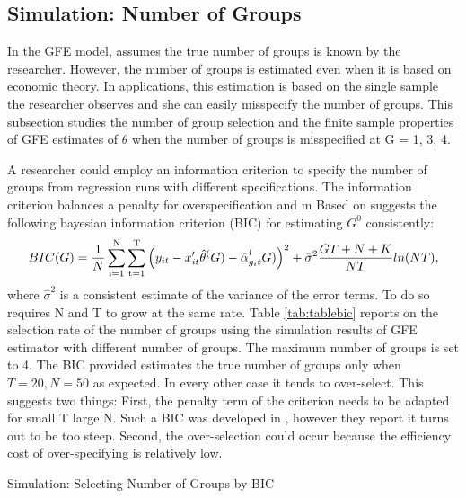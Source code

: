 \subsection{Simulation: Number of Groups}
In the GFE model, \textcite{bonhomme2015grouped} assumes the true number of groups is known by the researcher. However, the number of groups is %
estimated even when it is based on economic theory. In applications, this estimation is based on the single sample the researcher observes and she can easily  misspecify the number of groups. This subsection studies the number of group selection and the finite sample properties of GFE estimates of $\theta$ when the number of groups is misspecified at G = 1, 3, 4.

A researcher could employ an information criterion to specify the number of groups from regression runs with different specifications. The information criterion balances a penalty for overspecification and m
Based on \textcite{bai2002determining} \textcite{bonhomme2015grouped} suggests the following bayesian information criterion (BIC) for estimating $G^0$ consistently:
\begin{align}
    BIC(G) = \dfrac{1}{N} \operatorname*{\sum_{i=1}^N} \operatorname*{\sum_{t=1}^T} \left(y_{it} - x_{it}'\hat{\theta}^(G) - \hat{\alpha}_{g_it}^(G) \right)^2 + \hat{\sigma}^2 \dfrac{GT + N + K}{NT}ln(NT),
\end{align}
where $\hat{\sigma}^2$ is a consistent estimate of the variance of the error terms. To do so requires N and T to grow at the same rate. Table \ref{tab:tablebic} reports on the selection rate of the number of groups using the simulation results of GFE estimator with different number of groups. The maximum number of groups is set to 4. The BIC provided estimates the true number of groups only when $T=20, N=50$ as expected. In every other case it tends to over-select. This suggests two things: First, the penalty term of the criterion needs to be adapted for small T large N. Such a BIC was developed in \textcite{janys2021mental}, however they report it turns out to be too steep. Second, the over-selection could occur because the efficiency cost of over-specifying is relatively low. 

\begin{table}[h!]
    \centering
    \caption{Simulation: Selecting Number of Groups by BIC}
    
    \label{tab:tablebic}
\end{table}


